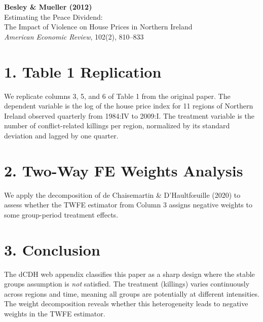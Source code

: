 \documentclass[12pt]{article}
\begin{document}
\begin{center}
{\Large\bfseries Besley \& Mueller (2012)}\\
{\large Estimating the Peace Dividend:}\\
{\large The Impact of Violence on House Prices in Northern Ireland}\\
\vspace{0.5em}
{\normalsize \textit{American Economic Review}, 102(2), 810--833}
\end{center}

\vspace{1em}

\section*{1. Table 1 Replication}

We replicate columns 3, 5, and 6 of Table 1 from the original paper. 
The dependent variable is the log of the house price index for 11 regions 
of Northern Ireland observed quarterly from 1984:IV to 2009:I. 
The treatment variable is the number of conflict-related killings per region, 
normalized by its standard deviation and lagged by one quarter.



\clearpage

\section*{2. Two-Way FE Weights Analysis}

We apply the decomposition of de Chaisemartin \& D'Haultf\oe uille (2020) 
to assess whether the TWFE estimator from Column 3 assigns negative weights 
to some group-period treatment effects.



\section*{3. Conclusion}

The dCDH web appendix classifies this paper as a sharp design 
where the stable groups assumption is \textit{not} satisfied. 
The treatment (killings) varies continuously across regions and time, 
meaning all groups are potentially  at different intensities. 
The weight decomposition reveals whether this heterogeneity 
leads to negative weights in the TWFE estimator.
\end{document}
